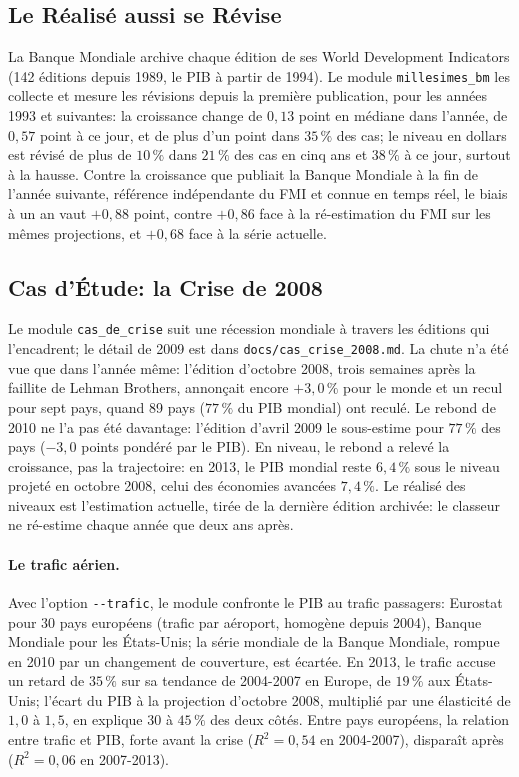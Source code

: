 \documentclass[11pt,a4paper]{article}
\begin{document}
\subsection{Le Réalisé aussi se Révise}
La Banque Mondiale archive chaque édition de ses World Development Indicators (142 éditions depuis 1989, le PIB à partir de 1994). Le module \texttt{millesimes\_bm} les collecte et mesure les révisions depuis la première publication, pour les années 1993 et suivantes: la croissance change de $0{,}13$ point en médiane dans l'année, de $0{,}57$ point à ce jour, et de plus d'un point dans $35\,\%$ des cas; le niveau en dollars est révisé de plus de $10\,\%$ dans $21\,\%$ des cas en cinq ans et $38\,\%$ à ce jour, surtout à la hausse. Contre la croissance que publiait la Banque Mondiale à la fin de l'année suivante, référence indépendante du FMI et connue en temps réel, le biais à un an vaut $+0{,}88$ point, contre $+0{,}86$ face à la ré-estimation du FMI sur les mêmes projections, et $+0{,}68$ face à la série actuelle.

\subsection{Cas d'Étude: la Crise de 2008}
Le module \texttt{cas\_de\_crise} suit une récession mondiale à travers les éditions qui l'encadrent; le détail de 2009 est dans \texttt{docs/cas\_crise\_2008.md}. La chute n'a été vue que dans l'année même: l'édition d'octobre 2008, trois semaines après la faillite de Lehman Brothers, annonçait encore $+3{,}0\,\%$ pour le monde et un recul pour sept pays, quand 89 pays ($77\,\%$ du PIB mondial) ont reculé. Le rebond de 2010 ne l'a pas été davantage: l'édition d'avril 2009 le sous-estime pour $77\,\%$ des pays ($-3{,}0$ points pondéré par le PIB). En niveau, le rebond a relevé la croissance, pas la trajectoire: en 2013, le PIB mondial reste $6{,}4\,\%$ sous le niveau projeté en octobre 2008, celui des économies avancées $7{,}4\,\%$. Le réalisé des niveaux est l'estimation actuelle, tirée de la dernière édition archivée: le classeur ne ré-estime chaque année que deux ans après.

\paragraph{Le trafic aérien.} Avec l'option \texttt{-{}-trafic}, le module confronte le PIB au trafic passagers: Eurostat pour 30 pays européens (trafic par aéroport, homogène depuis 2004), Banque Mondiale pour les États-Unis; la série mondiale de la Banque Mondiale, rompue en 2010 par un changement de couverture, est écartée. En 2013, le trafic accuse un retard de $35\,\%$ sur sa tendance de 2004-2007 en Europe, de $19\,\%$ aux États-Unis; l'écart du PIB à la projection d'octobre 2008, multiplié par une élasticité de $1{,}0$ à $1{,}5$, en explique $30$ à $45\,\%$ des deux côtés. Entre pays européens, la relation entre trafic et PIB, forte avant la crise ($R^2 = 0{,}54$ en 2004-2007), disparaît après ($R^2 = 0{,}06$ en 2007-2013).
\end{document}
